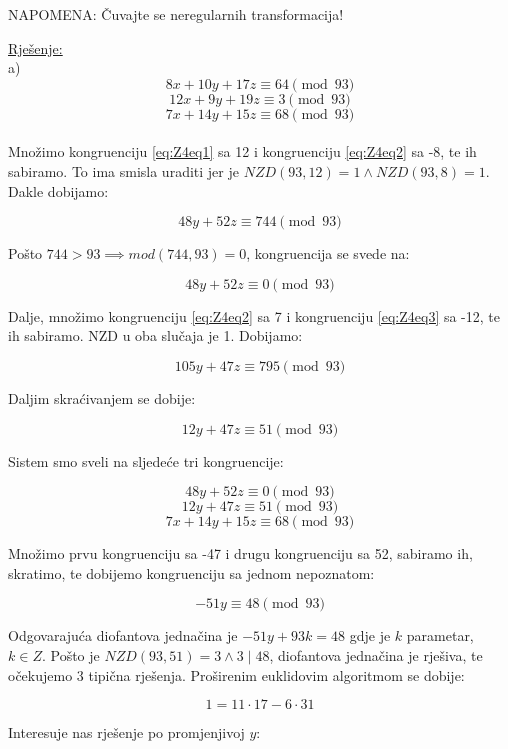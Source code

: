 \documentclass[12pt]{article}
\begin{document}
NAPOMENA: Čuvajte se neregularnih transformacija!

\underline{Rješenje:}\\

a)
\[
8x + 10y + 17z \equiv 64 \pmod{93} \label{eq:Z4eq1} \tag{1}
\]
\[
12x + 9y + 19z \equiv 3 \pmod{93} \label{eq:Z4eq2} \tag{2}
\]
\[
7x + 14y + 15z \equiv 68 \pmod{93} \label{eq:Z4eq3} \tag{3}
\]
\\
Množimo kongruenciju \ref{eq:Z4eq1} sa 12 i kongruenciju \ref{eq:Z4eq2} sa -8, te ih sabiramo. To ima smisla uraditi jer je $NZD(93, 12) = 1 \land NZD(93, 8) = 1$. Dakle dobijamo:

$$48y + 52z \equiv 744 \pmod{93}$$\vspace{1mm}

Pošto $744 > 93 \implies mod(744, 93) = 0$, kongruencija se svede na:

$$48y + 52z \equiv 0 \pmod{93}$$ \vspace{1mm}

Dalje, množimo kongruenciju \ref{eq:Z4eq2} sa 7 i kongruenciju \ref{eq:Z4eq3} sa -12, te ih sabiramo. NZD u oba slučaja je 1. Dobijamo:

$$105y + 47z \equiv 795 \pmod{93}$$\vspace{1mm}

Daljim skraćivanjem se dobije:

$$12y + 47z \equiv 51 \pmod{93}$$\vspace{1mm}

Sistem smo sveli na sljedeće tri kongruencije:

$$48y + 52z \equiv 0 \pmod{93}$$
$$12y + 47z \equiv 51 \pmod{93}$$
$$7x + 14y + 15z \equiv 68 \pmod{93}$$\vspace{1mm}

Množimo prvu kongruenciju sa -47 i drugu kongruenciju sa 52, sabiramo ih, skratimo, te dobijemo kongruenciju sa jednom nepoznatom:

$$-51y \equiv 48 \pmod{93}$$\vspace{1mm}

Odgovarajuća diofantova jednačina je $-51y + 93k = 48$ gdje je $k$ parametar, $k \in Z$. Pošto je $NZD(93, 51) = 3 \land 3 \mid 48$, diofantova jednačina je rješiva, te očekujemo 3 tipična rješenja. Proširenim euklidovim algoritmom se dobije:

$$1 = 11 \cdot 17 - 6 \cdot 31$$\vspace{1mm}

Interesuje nas rješenje po promjenjivoj $y$:
\end{document}
